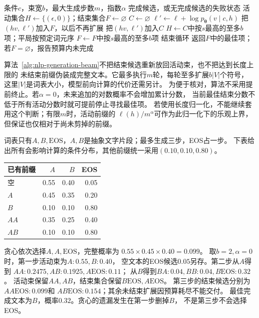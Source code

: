 \begin{algorithm}[带独立结束集合的束搜索]
  \label{alg:nlp-generation-beam}
  \begin{algorithmic}[1]
    \Require 条件$c$，束宽$b$，最大生成步数$m$，指数$\alpha$
    \Ensure 完成候选，或无完成候选的失败状态
    \State 活动集合$H\gets\{(\epsilon,0)\}$；结束集合$F\gets\varnothing$
      \State $C\gets\varnothing$
        \State $\ell'\gets\ell+\log p_{\bm{\theta}}(v\mid c,h)$
          \State 把$(hv,\ell')$加入$F$，以后不再扩展
          \State 把$(hv,\ell')$加入$C$
        \EndIf
      \EndFor
      \State $H\gets C$中按$s$最高的至多$b$项；平局按预定词元序
      \State $F\gets F$中按$s$最高的至多$b$项
        \State 结束循环
      \EndIf
    \EndFor
    \State 返回$F$中的最佳项；若$F=\varnothing$，报告预算内未完成
  \end{algorithmic}
\end{algorithm}

算法~\ref{alg:nlp-generation-beam}不把结束候选重新放回活动束，也不把达到长度上限的
未结束前缀伪装成完整文本。它最多执行$m$轮，每轮至多扩展$b|V|$个符号，
这里$|V|$是词表大小，模型前向计算的代价还需另计。
为便于核对，算法不采用提前终止。若$\alpha=0$，未来追加的对数概率不会增加累计分数，
当前最佳结束分数不低于所有活动分数时就可提前停止寻找最佳项。
若使用长度归一化，不能继续套用这个判断；有限$m$时，活动前缀的
$\ell(h)/m^\alpha$可作为此归一化下的乐观上界，但保证也仅相对于尚未剪掉的前缀。

\begin{example}[三步生成中的一次早期遗漏]
  \label{ex:nlp-generation-beam}
  词表只有$A,B,\mathrm{EOS}$，$A,B$是抽象文字片段；最多生成三步，EOS占一步。
  下表给出所有会影响计算的条件分布，其他前缀统一采用$(0.10,0.10,0.80)$。
  \begin{center}
    \begin{tabular}{@{}lrrr@{}}
      \toprule
      已有前缀 & $A$ & $B$ & EOS\\
      \midrule
      空 & 0.55 & 0.40 & 0.05\\
      $A$ & 0.45 & 0.35 & 0.20\\
      $B$ & 0.10 & 0.10 & 0.80\\
      $AA$ & 0.35 & 0.25 & 0.40\\
      $AB$ & 0.10 & 0.10 & 0.80\\
      \bottomrule
    \end{tabular}
  \end{center}
  贪心依次选择$A,A,\mathrm{EOS}$，完整概率为
  $0.55\times0.45\times0.40=0.099$。
  取$b=2,\alpha=0$时，第一步活动束为$A:0.55,B:0.40$，
  空文本的EOS候选$0.05$另存。第二步从$A$得到
  $AA:0.2475,AB:0.1925,A\mathrm{EOS}:0.11$；
  从$B$得到$BA:0.04,BB:0.04,B\mathrm{EOS}:0.32$。
  活动束保留$AA,AB$，结束集合保留$B\mathrm{EOS},A\mathrm{EOS}$。
  第三步的结束候选分别为$AA\mathrm{EOS}:0.099$和
  $AB\mathrm{EOS}:0.154$；其余未结束扩展因预算耗尽不能交付。
  最佳完成文本为$B$，概率$0.32$。贪心的遗漏发生在第一步删掉$B$，
  不是第三步不会选择EOS。
\end{example}

